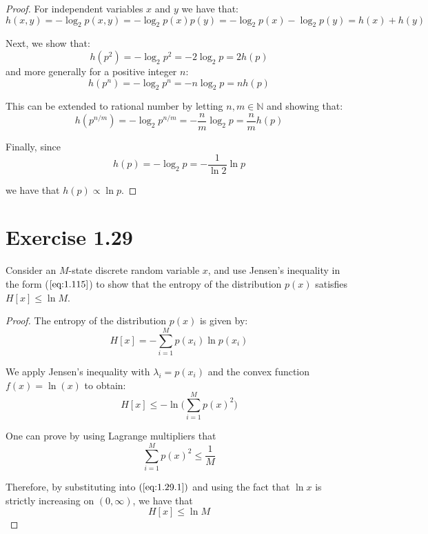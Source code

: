 \vspace{1em}

\begin{proof}
    For independent variables $x$ and $y$ we have that:
    \[
        h(x, y) = -\log_2 p(x, y) = -\log_2 p(x) p(y) = -\log_2 p(x) -\log_2 p(y) = h(x) + h(y)
    \] 

    Next, we show that:
    \[
        h(p^2) = -\log_2 p^2 = -2 \log_2 p = 2h(p)
    \] 
    and more generally for a positive integer $n$:
    \[
        h(p^n) = -\log_2 p^n = -n \log_2 p = nh(p)
    \] 

    This can be extended to rational number by letting $n, m \in \mathbb{N}$ and
    showing that:
     \[
         h(p^{n/m}) = -\log_2 p^{n/m} = -\frac{n}{m} \log_2 p = \frac{n}{m} h(p)
    \] 

    Finally, since
    \[
        h(p) = -\log_2 p = -\frac{1}{\ln 2} \ln p
    \] 
    
    we have that $h(p) \propto \ln p$.
\end{proof}

\vspace{1em}

\section*{Exercise 1.29}
Consider an $M$-state  discrete random variable $x$, and use Jensen's inequality
in the form ($\ref{eq:1.115}$) to show that the entropy of the distribution
$p(x)$ satisfies $H[x] \leq \ln M$.

\vspace{1em}

\begin{proof}
    The entropy of the distribution $p(x)$ is given by:
    \[
        H[x] = - \sum_{i=1}^{M} p(x_i) \ln p(x_i) 
    \] 

    We apply Jensen's inequality with $\lambda_i = p(x_i)$ and the convex
    function $f(x) = \ln(x)$ to obtain:
    \begin{equation}\label{eq:1.29.1}\tag{1.29.1}
        H[x] \leq -\ln\bigg(\sum_{i=1}^{M} p(x)^2\bigg)
    \end{equation}

    One can prove by using Lagrange multipliers that
    \[
        \sum_{i=1}^{M} p(x)^2 \leq \frac{1}{M}
    \] 

    Therefore, by substituting into $(\ref{eq:1.29.1})$ and using 
    the fact that $\ln x$ is strictly increasing on $(0, \infty)$,
    we have that
    \[
        H[x] \leq \ln M
    \] 
\end{proof}

